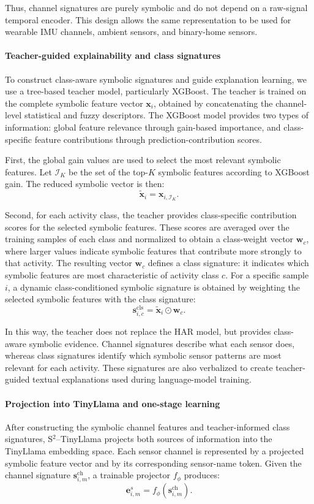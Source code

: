 \documentclass[preprint,12pt]{elsarticle}
\begin{document}
Thus, channel signatures are purely symbolic and do not depend on a raw-signal temporal encoder. This design allows the same representation to be used for wearable IMU channels, ambient sensors, and binary-home sensors.

\paragraph{Teacher-guided explainability and class signatures}
To construct class-aware symbolic signatures and guide explanation learning, we use a tree-based teacher model, particularly XGBoost. The teacher is trained on the complete symbolic feature vector $\mathbf{x}_i$, obtained by concatenating the channel-level statistical and fuzzy descriptors. The XGBoost model provides two types of information: global feature relevance through gain-based importance, and class-specific feature contributions through prediction-contribution scores.

First, the global gain values are used to select the most relevant symbolic features. Let $\mathcal{I}_K$ be the set of the top-$K$ symbolic features according to XGBoost gain. The reduced symbolic vector is then:
\[
\tilde{\mathbf{x}}_i = \mathbf{x}_{i,\mathcal{I}_K}.
\]

Second, for each activity class, the teacher provides class-specific contribution scores for the selected symbolic features. These scores are averaged over the training samples of each class and normalized to obtain a class-weight vector $\mathbf{w}_c$, where larger values indicate symbolic features that contribute more strongly to that activity. The resulting vector $\mathbf{w}_c$ defines a class signature: it indicates which symbolic features are most characteristic of activity class $c$. For a specific sample $i$, a dynamic class-conditioned symbolic signature is obtained by weighting the selected symbolic features with the class signature:
\[
\mathbf{s}_{i,c}^{\mathrm{cls}}
=
\tilde{\mathbf{x}}_i \odot \mathbf{w}_c.
\]

In this way, the teacher does not replace the HAR model, but provides class-aware symbolic evidence. Channel signatures describe what each sensor does, whereas class signatures identify which symbolic sensor patterns are most relevant for each activity. These signatures are also verbalized to create teacher-guided textual explanations used during language-model training.

\paragraph{Projection into TinyLlama and one-stage learning}
After constructing the symbolic channel features and teacher-informed class signatures, S$^2$--TinyLlama projects both sources of information into the TinyLlama embedding space. Each sensor channel is represented by a projected symbolic feature vector and by its corresponding sensor-name token. Given the channel signature $\mathbf{s}_{i,m}^{\mathrm{ch}}$, a trainable projector $f_{\phi}$ produces:
\[
\mathbf{e}_{i,m}^{s} = f_{\phi}(\mathbf{s}_{i,m}^{\mathrm{ch}}).
\]
\end{document}
